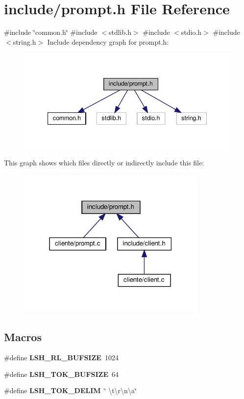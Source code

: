 \section{include/prompt.h File Reference}
\label{prompt_8h}
{\ttfamily \#include \char`\"{}common.\+h\char`\"{}}\newline
{\ttfamily \#include $<$stdlib.\+h$>$}\newline
{\ttfamily \#include $<$stdio.\+h$>$}\newline
{\ttfamily \#include $<$string.\+h$>$}\newline
Include dependency graph for prompt.\+h\+:\nopagebreak
\begin{figure}[H]
\begin{center}
\leavevmode
\includegraphics[width=340pt]{prompt_8h__incl}
\end{center}
\end{figure}
This graph shows which files directly or indirectly include this file\+:
\nopagebreak
\begin{figure}[H]
\begin{center}
\leavevmode
\includegraphics[width=266pt]{prompt_8h__dep__incl}
\end{center}
\end{figure}
\subsection*{Macros}
\begin{DoxyCompactItemize}
\item 
\#define \textbf{ L\+S\+H\+\_\+\+R\+L\+\_\+\+B\+U\+F\+S\+I\+ZE}~1024
\item 
\#define \textbf{ L\+S\+H\+\_\+\+T\+O\+K\+\_\+\+B\+U\+F\+S\+I\+ZE}~64
\item 
\#define \textbf{ L\+S\+H\+\_\+\+T\+O\+K\+\_\+\+D\+E\+L\+IM}~\char`\"{} \textbackslash{}t\textbackslash{}r\textbackslash{}n\textbackslash{}a\char`\"{}
\end{DoxyCompactItemize}
